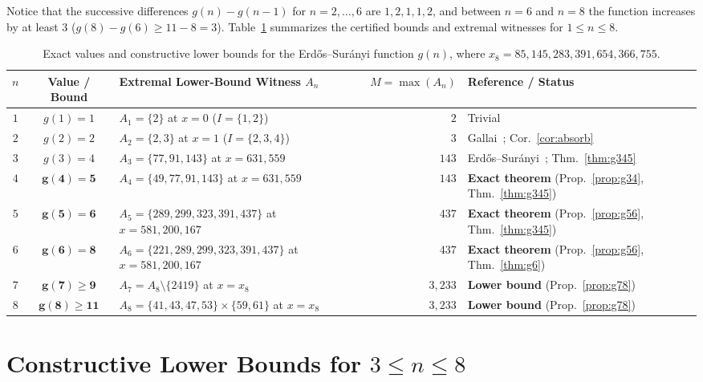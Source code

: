\documentclass[11pt]{article}
\begin{document}
Notice that the successive differences $g(n) - g(n - 1)$ for $n = 2, \dots, 6$ are $1, 2, 1, 1, 2$, and between $n = 6$ and $n = 8$ the function increases by at least $3$ ($g(8) - g(6) \ge 11 - 8 = 3$). Table~\ref{tab:summary} summarizes the certified bounds and extremal witnesses for $1 \le n \le 8$.

\begin{table}[ht]
\centering
\small
\begin{tabular}{ccp{5.3cm}rp{4.3cm}}
\toprule
$n$ & Value / Bound & Extremal Lower-Bound Witness $A_n$ & $M = \max(A_n)$ & Reference / Status \\
\midrule
$1$ & $g(1) = 1$ & $A_1 = \{2\}$ at $x = 0$ ($I = \{1, 2\}$) & $2$ & Trivial \\
$2$ & $g(2) = 2$ & $A_2 = \{2, 3\}$ at $x = 1$ ($I = \{2, 3, 4\}$) & $3$ & Gallai~\cite{erdossuranyi59}; Cor.~\ref{cor:absorb} \\
$3$ & $g(3) = 4$ & $A_3 = \{77, 91, 143\}$ at $x = 631{,}559$ & $143$ & Erd\H{o}s--Sur\'anyi~\cite{erdossuranyi59}; Thm.~\ref{thm:g345} \\
$4$ & $\mathbf{g(4) = 5}$ & $A_4 = \{49, 77, 91, 143\}$ at $x = 631{,}559$ & $143$ & \textbf{Exact theorem} (Prop.~\ref{prop:g34}, Thm.~\ref{thm:g345}) \\
$5$ & $\mathbf{g(5) = 6}$ & $A_5 = \{289, 299, 323, 391, 437\}$ at $x = 581{,}200{,}167$ & $437$ & \textbf{Exact theorem} (Prop.~\ref{prop:g56}, Thm.~\ref{thm:g345}) \\
$6$ & $\mathbf{g(6) = 8}$ & $A_6 = \{221, 289, 299, 323, 391, 437\}$ at $x = 581{,}200{,}167$ & $437$ & \textbf{Exact theorem} (Prop.~\ref{prop:g56}, Thm.~\ref{thm:g6}) \\
$7$ & $\mathbf{g(7) \ge 9}$ & $A_7 = A_8 \setminus \{2419\}$ at $x = x_8$ & $3{,}233$ & \textbf{Lower bound} (Prop.~\ref{prop:g78}) \\
$8$ & $\mathbf{g(8) \ge 11}$ & $A_8 = \{41, 43, 47, 53\} \times \{59, 61\}$ at $x = x_8$ & $3{,}233$ & \textbf{Lower bound} (Prop.~\ref{prop:g78}) \\
\bottomrule
\end{tabular}
\caption{Exact values and constructive lower bounds for the Erd\H{o}s--Sur\'anyi function $g(n)$, where $x_8 = 85{,}145{,}283{,}391{,}654{,}366{,}755$.}
\label{tab:summary}
\end{table}

\section{Constructive Lower Bounds for $3 \le n \le 8$}
\end{document}
